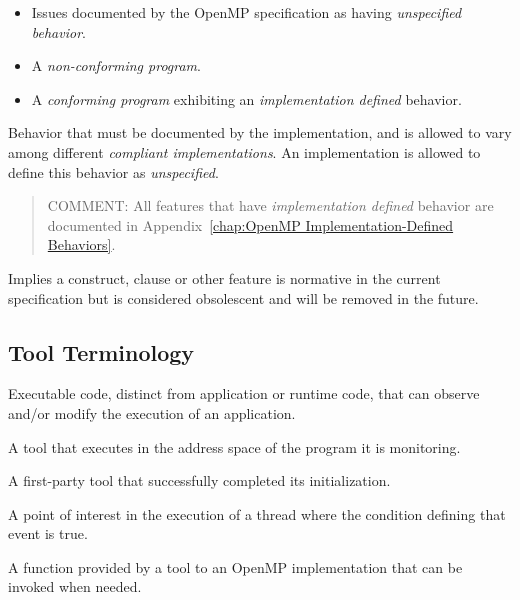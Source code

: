 \begin{itemize}
\item Issues documented by the OpenMP specification as having \emph{unspecified 
behavior}.

\item A \emph{non-conforming program}.

\item A \emph{conforming program} exhibiting an \emph{implementation defined} behavior.
\end{itemize}
\glossarydefend

\glossarydefstart
Behavior that must be documented by the implementation, and is allowed to vary 
among different \emph{compliant implementations}. An implementation is allowed to 
define this behavior as \emph{unspecified}.

\begin{quote}
COMMENT: All features that have \emph{implementation defined} behavior 
are documented in Appendix~\ref{chap:OpenMP Implementation-Defined Behaviors}.
\end{quote}
\glossarydefend

\glossarydefstart
Implies a construct, clause or other feature is normative in the current specification but is considered obsolescent and will be removed in the future.
\glossarydefend

\subsection{Tool Terminology}

\glossarydefstart
Executable code, distinct from application or runtime code, that can observe and/or modify the execution of an application.
\glossarydefend

\glossarydefstart
A tool that executes in the address space of the program it is monitoring.
\glossarydefend



\glossarydefstart
A first-party tool that successfully completed its initialization.
\glossarydefend

\glossarydefstart
A point of interest in the execution of a thread where the condition
defining that event is true. 
\glossarydefend

\glossarydefstart
A function provided by a tool to an OpenMP implementation that can be invoked when needed.
\glossarydefend

